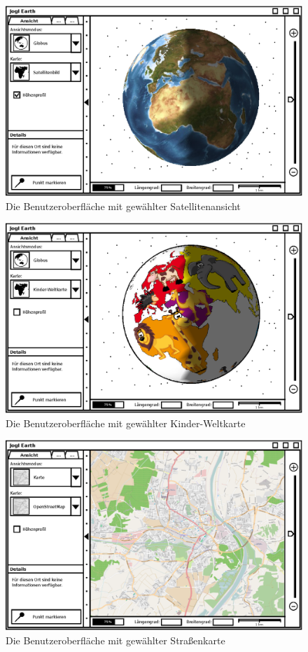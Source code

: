 \documentclass[10pt]{scrreprt}
\begin{document}
\begin{figure}
	\centering
	\includegraphics[scale=0.9]{GUI-Ansicht-Welt.eps}
	\caption{Die Benutzeroberfläche mit gewählter Satellitenansicht}
\end{figure}
\begin{figure}
	\centering
	\includegraphics[scale=0.9]{GUI-Ansicht-Kinder-Weltkarte.eps}
	\caption{Die Benutzeroberfläche mit gewählter Kinder-Weltkarte}
\end{figure}
\begin{figure}
	\centering
	\includegraphics[scale=0.9]{GUI-Ansicht-Strassenkarte.eps}
	\caption{Die Benutzeroberfläche mit gewählter Straßenkarte}
\end{figure}
\end{document}
